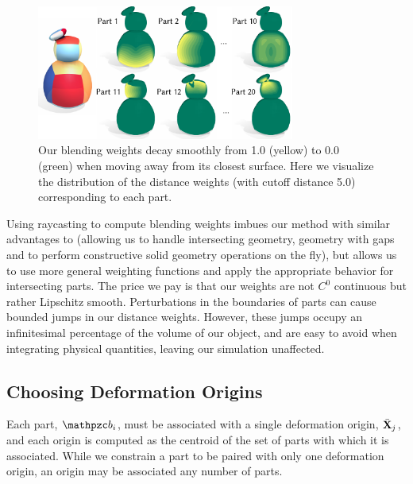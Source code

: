 \begin{figure}[h]
    \centering
    \includegraphics[width=3.33in]{figures/distance_weight_puft.pdf}
    \caption{Our blending weights decay smoothly from 1.0 (yellow) to 0.0 (green) when moving away from its closest surface. Here we visualize the distribution of the distance weights (with cutoff distance 5.0) corresponding to each part.   
    }
    \label{fig:distance_weight_puft}
    \vspace{-5pt}
  \end{figure} 

Using raycasting to compute blending weights imbues our method with similar advantages to \citet{Sawhney:2020:MCG} (allowing us to 
handle intersecting geometry, geometry with gaps and to perform constructive solid geometry operations on the fly),
but allows us to use more general weighting functions and apply the appropriate behavior for intersecting parts.
The price we pay is that our weights are not $C^0$ continuous but rather Lipschitz smooth.
Perturbations in the boundaries of parts can cause bounded jumps in our distance weights. 
However, these jumps occupy an infinitesimal percentage of the volume of our object, and are easy to avoid when integrating
physical quantities, leaving our simulation unaffected. 

\subsection{Choosing Deformation Origins}
\label{sec:origins}
Each part, $\prt_i$, must be associated with a single deformation origin, $\bar{\mathbf{X}}_j$, and each origin is computed as the centroid of the set of parts with which it is associated. 
While we constrain a part to be paired with only one deformation origin, an origin may be associated any number of parts. 

